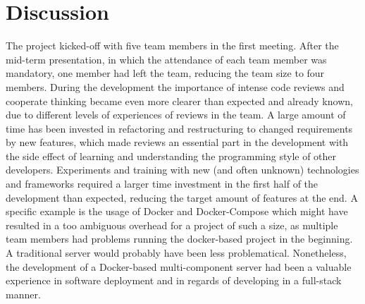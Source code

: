 \section{Discussion} 
The project kicked-off with five team members in the first meeting. After the mid-term presentation, in which the attendance of each team member was mandatory, one member had left the team, reducing the team size to four members.
During the development the importance of intense code reviews and cooperate thinking became even more clearer than expected and already known, due to different levels of experiences of reviews in the team. A large amount of time has been invested in refactoring and restructuring to changed requirements by new features, which made reviews an essential part in the development with the side effect of learning and understanding the programming style of other developers.
Experiments and training with new (and often unknown) technologies and frameworks required a larger time investment in the first half of the development than expected, reducing the target amount of features at the end. A specific example is the usage of Docker and Docker-Compose which might have resulted in a too ambiguous overhead for a project of such a size, as multiple team members had problems running the docker-based project in the beginning. A traditional server would probably have been less problematical. Nonetheless, the development of a Docker-based multi-component server had been a valuable experience in software deployment and in regards of developing in a full-stack manner.